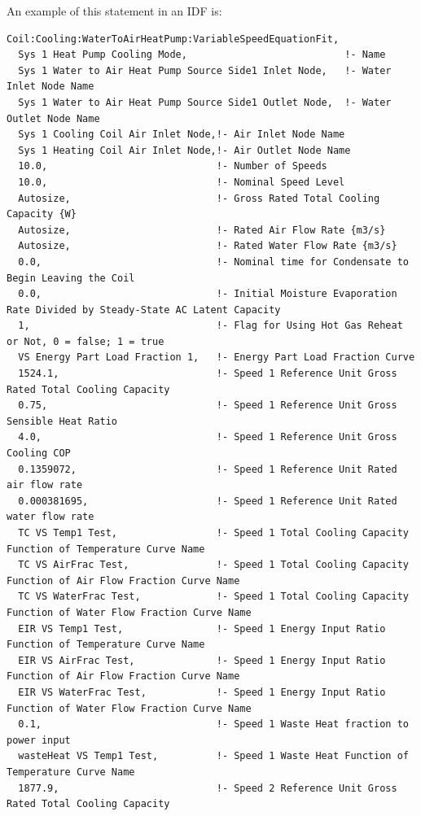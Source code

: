 An example of this statement in an IDF is:

\begin{lstlisting}
Coil:Cooling:WaterToAirHeatPump:VariableSpeedEquationFit,
  Sys 1 Heat Pump Cooling Mode,                           !- Name
  Sys 1 Water to Air Heat Pump Source Side1 Inlet Node,   !- Water Inlet Node Name
  Sys 1 Water to Air Heat Pump Source Side1 Outlet Node,  !- Water Outlet Node Name
  Sys 1 Cooling Coil Air Inlet Node,!- Air Inlet Node Name
  Sys 1 Heating Coil Air Inlet Node,!- Air Outlet Node Name
  10.0,                             !- Number of Speeds
  10.0,                             !- Nominal Speed Level
  Autosize,                         !- Gross Rated Total Cooling Capacity {W}
  Autosize,                         !- Rated Air Flow Rate {m3/s}
  Autosize,                         !- Rated Water Flow Rate {m3/s}
  0.0,                              !- Nominal time for Condensate to Begin Leaving the Coil
  0.0,                              !- Initial Moisture Evaporation Rate Divided by Steady-State AC Latent Capacity
  1,                                !- Flag for Using Hot Gas Reheat or Not, 0 = false; 1 = true
  VS Energy Part Load Fraction 1,   !- Energy Part Load Fraction Curve
  1524.1,                           !- Speed 1 Reference Unit Gross Rated Total Cooling Capacity
  0.75,                             !- Speed 1 Reference Unit Gross Sensible Heat Ratio
  4.0,                              !- Speed 1 Reference Unit Gross Cooling COP
  0.1359072,                        !- Speed 1 Reference Unit Rated air flow rate
  0.000381695,                      !- Speed 1 Reference Unit Rated water flow rate
  TC VS Temp1 Test,                 !- Speed 1 Total Cooling Capacity Function of Temperature Curve Name
  TC VS AirFrac Test,               !- Speed 1 Total Cooling Capacity Function of Air Flow Fraction Curve Name
  TC VS WaterFrac Test,             !- Speed 1 Total Cooling Capacity Function of Water Flow Fraction Curve Name
  EIR VS Temp1 Test,                !- Speed 1 Energy Input Ratio Function of Temperature Curve Name
  EIR VS AirFrac Test,              !- Speed 1 Energy Input Ratio Function of Air Flow Fraction Curve Name
  EIR VS WaterFrac Test,            !- Speed 1 Energy Input Ratio Function of Water Flow Fraction Curve Name
  0.1,                              !- Speed 1 Waste Heat fraction to power input
  wasteHeat VS Temp1 Test,          !- Speed 1 Waste Heat Function of Temperature Curve Name
  1877.9,                           !- Speed 2 Reference Unit Gross Rated Total Cooling Capacity

\end{lstlisting}
